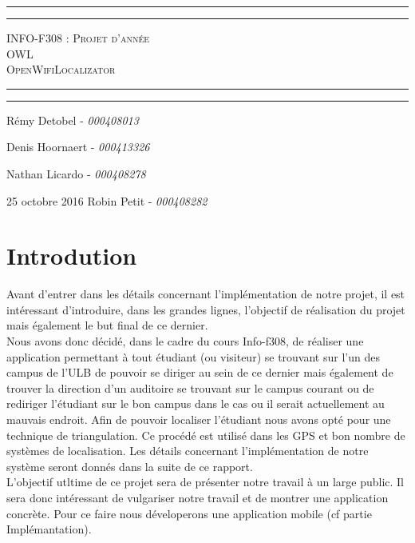 \documentclass[11pt,a4paper]{article}
\title{}
\author{}
\begin{document}
\begin{center}
    \vspace*{\fill}
        \hrule
        \vspace*{2pt}
        \hrule
        \vspace*{15pt}
        \textsc{\Huge{INFO-F308 : Projet d'année \\\vspace*{8pt}
            OWL\\\vspace*{12pt}
            OpenWifiLocalizator}}
        \vspace*{15pt}
        \hrule
        \vspace*{2pt}
        \hrule
  \vspace*{\fill}
\end{center}
\null
\vfill

\large
\hfill Rémy Detobel - \emph{000408013}

\hfill Denis Hoornaert - \emph{000413326}

\hfill Nathan Licardo - \emph{000408278}

25 octobre 2016 \hfill Robin Petit - \emph{000408282}
\newpage



\section{Introdution}
Avant d'entrer dans les détails concernant l'implémentation de notre projet, il est intéressant d'introduire, dans les grandes lignes, l'objectif de réalisation du projet mais également le but final de ce dernier.\\
Nous avons donc décidé, dans le cadre du cours Info-f308, de réaliser une application permettant à tout étudiant (ou visiteur) se trouvant sur l'un des campus de l'ULB de pouvoir se diriger au sein de ce dernier mais également de trouver la direction d'un auditoire se trouvant sur le campus \og courant \fg{} ou de rediriger l'étudiant sur le bon campus dans le cas ou il serait actuellement au mauvais endroit. Afin de pouvoir localiser l'étudiant nous avons opté pour une technique de triangulation. Ce procédé est utilisé dans les GPS et bon nombre de systèmes de localisation. Les détails concernant l'implémentation de notre système seront donnés dans la suite de ce rapport.\\
L'objectif utltime de ce projet sera de présenter notre travail à un large public. Il sera donc intéressant de \og vulgariser \fg{} notre travail et de montrer une application concrète. Pour ce faire nous déveloperons une application mobile (cf partie Implémantation).
\end{document}
